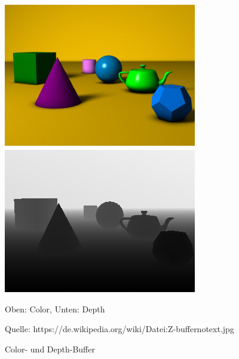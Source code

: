 \begin{figure}
	\centering
	\includegraphics[scale=0.5]{02theorie/DepthBuffer.jpg}
	
	
	Oben: Color, Unten: Depth
	
	Quelle: https://de.wikipedia.org/wiki/Datei:Z-buffer\textunderscore no\textunderscore text.jpg
	\caption{Color- und Depth-Buffer}\label{DepthBuffer}
\end{figure}


